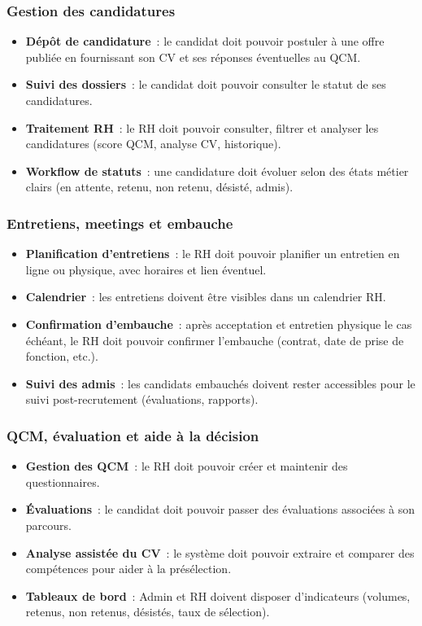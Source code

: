 \subsubsection{Gestion des candidatures}

\begin{itemize}
  \item \textbf{Dépôt de candidature}~: le candidat doit pouvoir postuler à une
        offre publiée en fournissant son CV et ses réponses éventuelles au QCM.
  \item \textbf{Suivi des dossiers}~: le candidat doit pouvoir consulter le
        statut de ses candidatures.
  \item \textbf{Traitement RH}~: le RH doit pouvoir consulter, filtrer et
        analyser les candidatures (score QCM, analyse CV, historique).
  \item \textbf{Workflow de statuts}~: une candidature doit évoluer selon des
        états métier clairs (en attente, retenu, non retenu, désisté, admis).
\end{itemize}


\subsubsection{Entretiens, meetings et embauche}

\begin{itemize}
  \item \textbf{Planification d'entretiens}~: le RH doit pouvoir planifier un
        entretien en ligne ou physique, avec horaires et lien éventuel.
  \item \textbf{Calendrier}~: les entretiens doivent être visibles dans un
        calendrier RH.
  \item \textbf{Confirmation d'embauche}~: après acceptation et entretien
        physique le cas échéant, le RH doit pouvoir confirmer l'embauche
        (contrat, date de prise de fonction, etc.).
  \item \textbf{Suivi des admis}~: les candidats embauchés doivent rester
        accessibles pour le suivi post-recrutement (évaluations, rapports).
\end{itemize}


\subsubsection{QCM, évaluation et aide à la décision}

\begin{itemize}
  \item \textbf{Gestion des QCM}~: le RH doit pouvoir créer et maintenir des
        questionnaires.
  \item \textbf{Évaluations}~: le candidat doit pouvoir passer des évaluations
        associées à son parcours.
  \item \textbf{Analyse assistée du CV}~: le système doit pouvoir extraire et
        comparer des compétences pour aider à la présélection.
  \item \textbf{Tableaux de bord}~: Admin et RH doivent disposer d'indicateurs
        (volumes, retenus, non retenus, désistés, taux de sélection).
\end{itemize}


